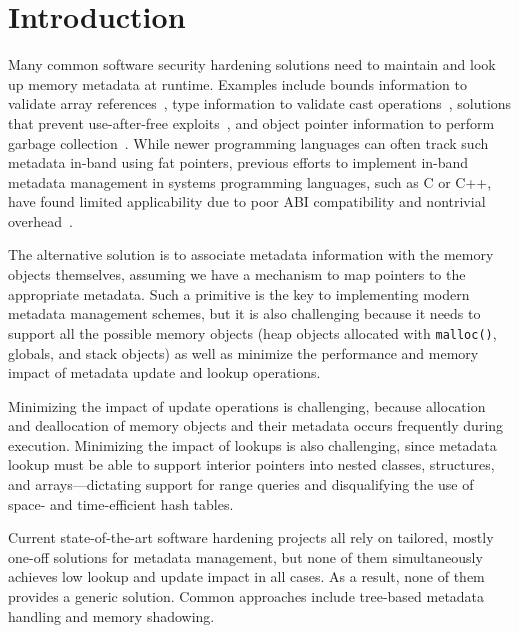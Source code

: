 \section{Introduction}
\label{sec:introduction}

Many common software security hardening solutions need to maintain and look up
memory metadata at runtime. Examples include bounds information to validate
array references~\cite{akritidis2008preventing,akritidis2009baggy}, type information to validate cast operations~\cite{lee2015type}, solutions that prevent use-after-free exploits~\cite{lee2015preventing,younan2015freesentry},
and object pointer information to perform garbage collection~\cite{rafkind2009precise}.
While newer programming languages can often track
such metadata in-band using fat pointers, previous efforts to implement
in-band metadata management in systems programming languages, such as C or C++,
have found limited applicability due to poor ABI compatibility and nontrivial overhead~\cite{dhurjati2006backwards}.

The alternative solution is to associate metadata information with the memory objects themselves, assuming we have a mechanism to map pointers to the appropriate metadata.
Such a  primitive is the key to implementing  modern metadata management schemes,
but it is also challenging because it needs to support all the possible memory objects (heap objects allocated
with \texttt{malloc()}, globals, and stack objects)
as well as minimize the performance and memory impact
of metadata update and lookup operations.

Minimizing the impact of update operations
is challenging,
because allocation and deallocation of memory objects and their metadata occurs frequently during execution. 
Minimizing the impact of lookups is also
challenging, since metadata lookup must be able to support interior pointers
into nested classes, structures, and arrays---dictating support for range queries and disqualifying the use of space- and time-efficient hash tables.

Current state-of-the-art software hardening projects all rely on tailored, mostly one-off 
solutions for metadata
management, but none of them simultaneously achieves low lookup and update impact in all cases. As a result, none
of them provides a generic solution. 
Common approaches include tree-based metadata handling and memory shadowing.
 
